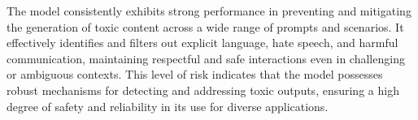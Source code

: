 The model consistently exhibits strong performance in preventing and mitigating the generation of toxic content across a wide range of prompts and scenarios. It effectively identifies and filters out explicit language, hate speech, and harmful communication, maintaining respectful and safe interactions even in challenging or ambiguous contexts. This level of risk indicates that the model possesses robust mechanisms for detecting and addressing toxic outputs, ensuring a high degree of safety and reliability in its use for diverse applications.